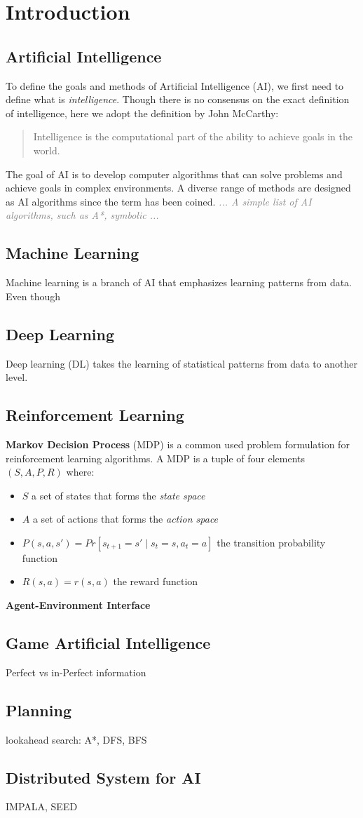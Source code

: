 \documentclass[12pt]{article}
\newcommand{\hint}[1]{ \textit{\textcolor{gray}{... #1 ...}} }
\begin{document}
\section*{Introduction}

\subsection*{Artificial Intelligence}

To define the goals and methods of Artificial Intelligence (AI), we first need to define what is \textit{intelligence}.
Though there is no consensus on the exact definition of intelligence, here we adopt the definition by John McCarthy:
\begin{quote}
    Intelligence is the computational part of the ability to achieve goals in the world.
\end{quote}
The goal of AI is to develop computer algorithms that can solve problems and achieve goals in complex environments.
A diverse range of methods are designed as AI algorithms since the term has been coined.
\hint{A simple list of AI algorithms, such as A*, symbolic}

\subsection*{Machine Learning}
Machine learning is a branch of AI that emphasizes learning patterns from data.
Even though 

\subsection*{Deep Learning}
Deep learning (DL) takes the learning of statistical patterns from data to another level.

\subsection*{Reinforcement Learning}
\textbf{Markov Decision Process} (MDP) is a common used problem formulation for reinforcement learning algorithms.
A MDP is a tuple of four elements $(S, A, P, R)$ where:
\begin{itemize}
    \item $S$ a set of states that forms the \textit{state space}
    \item $A$ a set of actions that forms the \textit{action space}
    \item $P(s, a, s') = Pr[ s_{t+1} = s' \mid  s_t = s, a_t = a] $ the transition probability function
    \item $R(s, a) = r(s, a)$ the reward function
\end{itemize}
\textbf{Agent-Environment Interface}

\subsection*{Game Artificial Intelligence}
Perfect vs in-Perfect information
\subsection*{Planning}
lookahead search: A*, DFS, BFS

\subsection*{Distributed System for AI}
IMPALA, SEED
\end{document}
